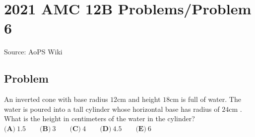 \documentclass[12pt]{article}
\begin{document}
\section*{{2021 AMC 12B Problems/Problem 6}}
Source: AoPS Wiki

\subsection*{Problem}
An inverted cone with base radius $12 \mathrm{cm}$ and height $18 \mathrm{cm}$ is full of water. The water is poured into a tall cylinder whose horizontal base has radius of $24 \mathrm{cm}$ . What is the height in centimeters of the water in the cylinder? $\textbf{(A)} ~1.5 \qquad\textbf{(B)} ~3 \qquad\textbf{(C)} ~4 \qquad\textbf{(D)} ~4.5 \qquad\textbf{(E)} ~6$
\end{document}
